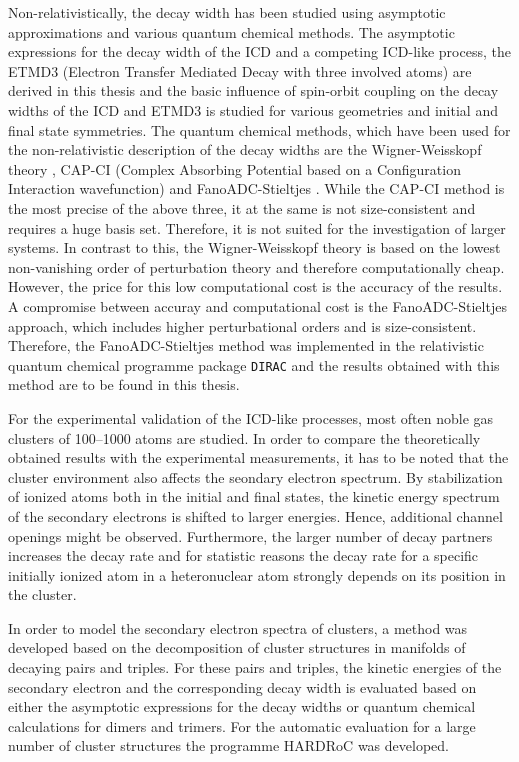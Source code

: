 Non-relativistically, the decay width has been studied using asymptotic
approximations \cite{Gokhberg10_1} and various quantum chemical methods.
The asymptotic expressions for the decay width of the \ac{ICD} and a competing
\ac{ICD}-like process, the ETMD3 (Electron Transfer Mediated Decay with three
involved atoms) are derived in this thesis and the basic influence of
spin-orbit coupling on the decay widths of the \ac{ICD} and ETMD3 is studied
for various geometries and initial and final state symmetries.
The quantum chemical methods, which have been used for the non-relativistic 
description of the decay widths are the Wigner-Weisskopf theory \cite{Santra02},
CAP-CI
(Complex Absorbing Potential based on a Configuration Interaction wavefunction)
\cite{SakuraiModern94,Santra01_3} and FanoADC-Stieltjes \cite{Averbukh05}.
While the CAP-CI method is the most precise of the above three, it at the same
is not size-consistent and requires a huge basis set. Therefore, it is not
suited for the investigation of larger systems. In contrast to this, the
Wigner-Weisskopf theory is based on the lowest non-vanishing order of perturbation
theory and therefore computationally cheap. However, the price for this low
computational cost is the accuracy of the results. A compromise between
accuray and computational cost is the FanoADC-Stieltjes approach, which includes
higher perturbational orders and is size-consistent.
Therefore, the FanoADC-Stieltjes method was implemented in the relativistic
quantum chemical programme package \verb|DIRAC| \cite{DIRAC13} and the results
obtained with this method are to be found in this thesis.

For the experimental validation of the \ac{ICD}-like processes, most often
noble gas clusters of 100--1000 atoms are studied. In order to compare the
theoretically obtained results with the experimental measurements, it has
to be noted that the cluster environment also affects the seondary electron
spectrum. By stabilization of ionized atoms both in the initial and final
states, the kinetic energy spectrum of the secondary electrons is shifted to
larger energies. Hence, additional channel openings might be observed.
Furthermore, the larger number of decay partners increases the decay rate
and for statistic reasons the decay rate for a specific initially ionized
atom in a heteronuclear atom strongly depends on its position in the cluster.

In order to model the secondary electron spectra of clusters, a method
was developed based on the decomposition of cluster structures in manifolds
of decaying pairs and triples. For these pairs and triples, the kinetic energies
of the secondary electron and the corresponding decay width is evaluated based
on either the asymptotic expressions for the decay widths or quantum chemical
calculations for dimers and trimers. For the automatic evaluation for
a large number of cluster structures the programme
\ac{HARDRoC} \cite{HARDRoC} was developed.

